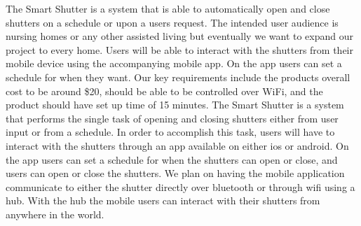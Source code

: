 The Smart Shutter is a system that is able to automatically open and close shutters on a schedule or upon a users request. The intended user audience is nursing homes or any other assisted living but eventually we want to expand our project to every home. Users will be able to interact with the shutters from their mobile device using the accompanying mobile app. On the app users can set a schedule for when they want. Our key requirements include the products overall cost to be around \$20, should be able to be controlled over WiFi, and the product should have set up time of 15 minutes.
The Smart Shutter is a system that performs the single task of opening and closing shutters either from user input or from a schedule. In order to accomplish this task, users will have to  interact with the shutters through an app available on either ios or android. On the app users can set a schedule for when the shutters can open or close, and users can open or close the shutters. We plan on having the mobile application communicate to either the shutter directly over bluetooth or through wifi using a hub. With the hub the mobile users can interact with their shutters from anywhere in the world.

